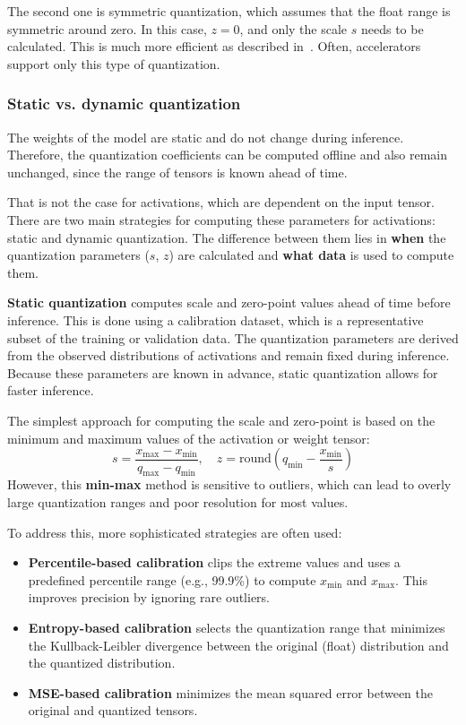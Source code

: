 The second one is symmetric quantization, which assumes that the float range is symmetric around zero. In this case, $z = 0$, and only the scale $s$ needs to be calculated. This is much more efficient as described in~\cite{nvidia_whitepaper}. Often, accelerators support only this type of quantization.

\subsubsection*{Static vs. dynamic quantization}

The weights of the model are static and do not change during inference. Therefore, the quantization coefficients can be computed offline and also remain unchanged, since the range of tensors is known ahead of time.

That is not the case for activations, which are dependent on the input tensor. There are two main strategies for computing these parameters for activations: static and dynamic quantization. The difference between them lies in \textbf{when} the quantization parameters ($s$, $z$) are calculated and \textbf{what data} is used to compute them.

\textbf{Static quantization} computes scale and zero-point values ahead of time before inference. This is done using a calibration dataset, which is a representative subset of the training or validation data. The quantization parameters are derived from the observed distributions of activations and remain fixed during inference. Because these parameters are known in advance, static quantization allows for faster inference.

The simplest approach for computing the scale and zero-point is based on the minimum and maximum values of the activation or weight tensor:
$$
    s = \frac{x_{\text{max}} - x_{\text{min}}}{q_{\text{max}} - q_{\text{min}}}, \quad z = \text{round}\left(q_{\text{min}} - \frac{x_{\text{min}}}{s}\right)
$$
However, this \textbf{min-max} method is sensitive to outliers, which can lead to overly large quantization ranges and poor resolution for most values.

To address this, more sophisticated strategies are often used:

\begin{itemize}
    \item \textbf{Percentile-based calibration} clips the extreme values and uses a predefined percentile range (e.g., 99.9\%) to compute $x_{\text{min}}$ and $x_{\text{max}}$. This improves precision by ignoring rare outliers.
    \item \textbf{Entropy-based calibration} selects the quantization range that minimizes the Kullback-Leibler divergence between the original (float) distribution and the quantized distribution.
    \item \textbf{MSE-based calibration} minimizes the mean squared error between the original and quantized tensors.
\end{itemize}

